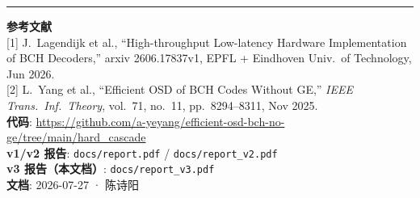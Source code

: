 \documentclass[11pt,a4paper]{article}
\begin{document}
\vspace{6pt}
\hrule
\vspace{4pt}
\noindent\footnotesize{
\textbf{参考文献}\\
{[1]} J.\ Lagendijk et al., ``High-throughput Low-latency Hardware Implementation of BCH Decoders,''
arxiv 2606.17837v1, EPFL + Eindhoven Univ.\ of Technology, Jun 2026.\\
{[2]} L.\ Yang et al., ``Efficient OSD of BCH Codes Without GE,''
{\it IEEE Trans.\ Inf.\ Theory}, vol.\ 71, no.\ 11, pp.\ 8294--8311, Nov 2025.\\
\textbf{代码}: \url{https://github.com/a-yeyang/efficient-osd-bch-no-ge/tree/main/hard_cascade}\\
\textbf{v1/v2 报告}: \texttt{docs/report.pdf} / \texttt{docs/report\_v2.pdf}\\
\textbf{v3 报告（本文档）}: \texttt{docs/report\_v3.pdf}\\
\textbf{文档}: 2026-07-27 · 陈诗阳
}
\end{document}
